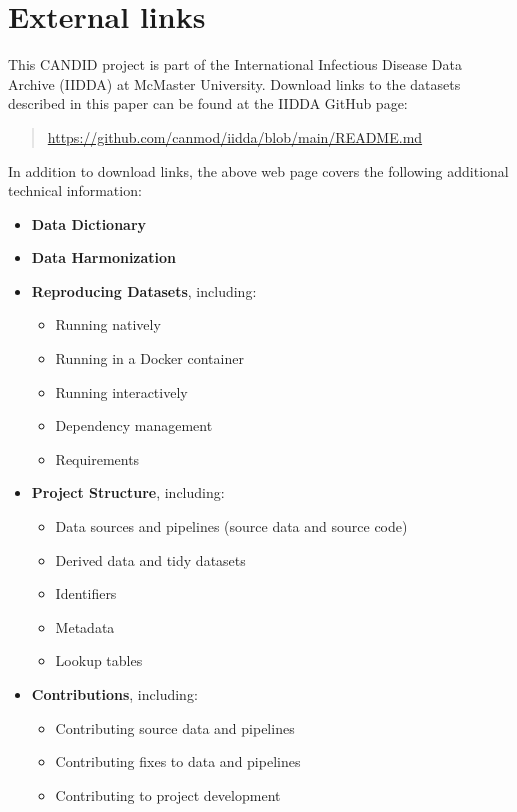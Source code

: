 \documentclass[12pt]{article}
\begin{document}
\clearpage

\section{External links}\label{sec:appendix-external-links}

This CANDID project is part of the International Infectious Disease Data Archive (IIDDA) at McMaster University. Download links to the datasets described in this paper can be found at the IIDDA GitHub page:
\begin{quote}
\url{https://github.com/canmod/iidda/blob/main/README.md}
\end{quote}
In addition to download links, the above web page covers the following additional technical information:

\begin{itemize}
  \item \textbf{Data Dictionary}
  \item \textbf{Data Harmonization}
  \item \textbf{Reproducing Datasets}, including:
    \begin{itemize}
      \item Running natively
      \item Running in a Docker container
      \item Running interactively
      \item Dependency management
      \item Requirements
    \end{itemize}
  \item \textbf{Project Structure}, including:
    \begin{itemize}
      \item Data sources and pipelines (source data and source code)
      \item Derived data and tidy datasets
      \item Identifiers
      \item Metadata
      \item Lookup tables
    \end{itemize}
  \item \textbf{Contributions}, including:
    \begin{itemize}
      \item Contributing source data and pipelines
      \item Contributing fixes to data and pipelines
      \item Contributing to project development
    \end{itemize}
\end{itemize}
\end{document}

